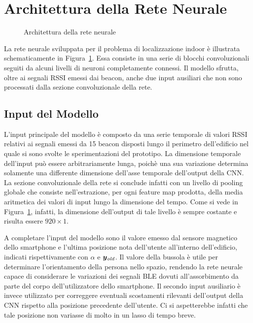 \section{Architettura della Rete Neurale}
\begin{figure}[!htp]
  \caption{Architettura della rete neurale}%
  \label{fig:crynet}%
\end{figure}
La rete neurale sviluppata per il problema di localizzazione indoor è
illustrata schematicamente in Figura~\ref{fig:crynet}. Essa consiste in una
serie di blocchi convoluzionali seguiti da alcuni livelli di neuroni
completamente connessi. Il modello sfrutta, oltre ai segnali RSSI emessi dai
beacon, anche due input ausiliari che non sono processati dalla sezione
convoluzionale della rete.
\subsection{Input del Modello}\label{subsec:input}
L'input principale del modello è composto da una serie temporale di valori RSSI
relativi ai segnali emessi da 15 beacon disposti lungo il perimetro
dell'edificio nel quale si sono svolte le sperimentazioni del prototipo. La
dimensione temporale dell'input può essere arbitrariamente lunga, poichè una
sua variazione determina solamente una differente dimensione dell'asse
temporale dell'output della CNN\@. La sezione convoluzionale della rete si
conclude infatti con un livello di pooling globale che consiste
nell'estrazione, per ogni feature map prodotta, della media aritmetica dei
valori di input lungo la dimensione del tempo. Come si vede in
Figura~\ref{fig:crynet}, infatti, la dimensione dell'output di tale livello è
sempre costante e risulta essere $920\times1$.

A completare l'input del modello sono il valore emesso dal sensore magnetico
dello smartphone e l'ultima posizione nota dell'utente all'interno
dell'edificio, indicati rispettivamente con \(\alpha\) e \( \bm y_{\mathit{old}} \). Il
valore della bussola è utile per determinare l'orientamento della persona nello
spazio, rendendo la rete neurale capace di considerare le variazioni dei
segnali BLE dovuti all'assorbimento da parte del corpo dell'utilizzatore dello
smartphone. Il secondo input ausiliario è invece utilizzato per correggere
eventuali scostamenti rilevanti dell'output della CNN rispetto alla posizione
precedente dell'utente. Ci si aspetterebbe infatti che tale posizione non
variasse di molto in un lasso di tempo breve.

